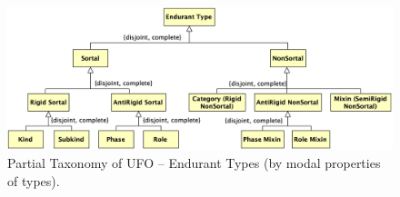 \documentclass{article}
\begin{document}



\begin{figure}[ht]
    \centering
    \includegraphics[width=\textwidth]{diagrams/Endurant_Type_Properties_Diagram.png}
    \caption{Partial Taxonomy of UFO -- Endurant Types (by modal properties of types).}
    \label{fig:ufo_taxonomy_endurant_types_properties}
\end{figure}



% 
% 
\end{document}
